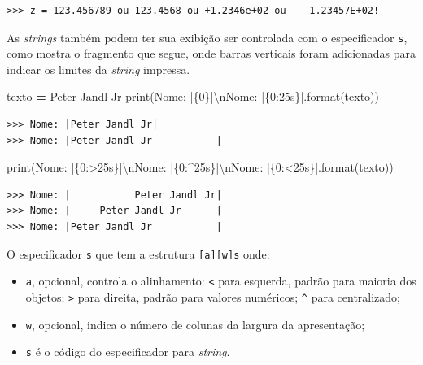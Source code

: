 \documentclass[
]{book}
\newenvironment{Shaded}{\begin{snugshade}}{\end{snugshade}}
\newcommand{\BuiltInTok}[1]{#1}
\newcommand{\CharTok}[1]{\textcolor[rgb]{0.31,0.60,0.02}{#1}}
\newcommand{\NormalTok}[1]{#1}
\newcommand{\OperatorTok}[1]{\textcolor[rgb]{0.81,0.36,0.00}{\textbf{#1}}}
\newcommand{\SpecialCharTok}[1]{\textcolor[rgb]{0.00,0.00,0.00}{#1}}
\newcommand{\StringTok}[1]{\textcolor[rgb]{0.31,0.60,0.02}{#1}}
\providecommand{\tightlist}{%
  \setlength{\itemsep}{0pt}\setlength{\parskip}{0pt}}
\begin{document}
\begin{verbatim}
>>> z = 123.456789 ou 123.4568 ou +1.2346e+02 ou    1.23457E+02!
\end{verbatim}

As \emph{strings} também podem ter sua exibição ser controlada com o especificador \texttt{s}, como mostra o fragmento que segue, onde barras verticais foram adicionadas para indicar os limites da \emph{string} impressa.

\begin{Shaded}
\begin{Highlighting}[]
\NormalTok{texto }\OperatorTok{=} \StringTok{\textquotesingle{}Peter Jandl Jr\textquotesingle{}}
\BuiltInTok{print}\NormalTok{(}\StringTok{\textquotesingle{}Nome: |}\SpecialCharTok{\{0\}}\StringTok{|}\CharTok{\textbackslash{}n}\StringTok{Nome: |}\SpecialCharTok{\{0:25s\}}\StringTok{|\textquotesingle{}}\NormalTok{.}\BuiltInTok{format}\NormalTok{(texto))}
\end{Highlighting}
\end{Shaded}

\begin{verbatim}
>>> Nome: |Peter Jandl Jr|
>>> Nome: |Peter Jandl Jr           |
\end{verbatim}

\begin{Shaded}
\begin{Highlighting}[]
\BuiltInTok{print}\NormalTok{(}\StringTok{\textquotesingle{}Nome: |}\SpecialCharTok{\{0:\textgreater{}25s\}}\StringTok{|}\CharTok{\textbackslash{}n}\StringTok{Nome: |}\SpecialCharTok{\{0:\^{}25s\}}\StringTok{|}\CharTok{\textbackslash{}n}\StringTok{Nome: |}\SpecialCharTok{\{0:\textless{}25s\}}\StringTok{|\textquotesingle{}}\NormalTok{.}\BuiltInTok{format}\NormalTok{(texto))}
\end{Highlighting}
\end{Shaded}

\begin{verbatim}
>>> Nome: |           Peter Jandl Jr|
>>> Nome: |     Peter Jandl Jr      |
>>> Nome: |Peter Jandl Jr           |
\end{verbatim}

O especificador \texttt{s} que tem a estrutura \texttt{{[}a{]}{[}w{]}s} onde:

\begin{itemize}
\tightlist
\item
  \texttt{a}, opcional, controla o alinhamento: \texttt{\textless{}} para esquerda, padrão para maioria dos objetos; \texttt{\textgreater{}} para direita, padrão para valores numéricos; \texttt{\^{}} para centralizado;
\item
  \texttt{w}, opcional, indica o número de colunas da largura da apresentação;
\item
  \texttt{s} é o código do especificador para \emph{string}.
\end{itemize}
\end{document}
